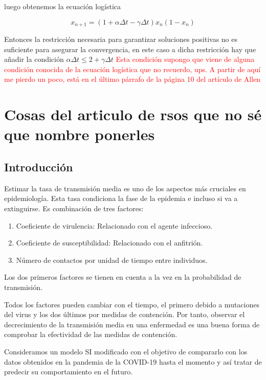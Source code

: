 luego obtenemos la ecuación logística

$$x_{n+1} = (1+\alpha \Delta t - \gamma \Delta t)x_n(1-x_n)$$

Entonces la restricción necesaria para garantizar soluciones positivas no es suficiente para asegurar la convergencia, en este caso a dicha restricción hay que añadir la condición $\alpha \Delta t \leq 2+\gamma \Delta t$ \textcolor{red}{Esta condición supongo que viene de alguna condición conocida de la ecuación logística que no recuerdo, ups. A partir de aquí me pierdo un poco, está en el último párrafo de la página 10 del artículo de Allen}


 







\section{Cosas del articulo de rsos que no sé que nombre ponerles}

\subsection{Introducción}

Estimar la tasa de transmisión media es uno de los aspectos más cruciales en epidemiología. Esta tasa condiciona la fase de la epidemia e incluso si va a extinguirse. Es combinación de tres factores:

\begin{enumerate}
\item Coeficiente de virulencia: Relacionado con el agente infeccioso.
\item Coeficiente de susceptibilidad: Relacionado con el anfitrión.
\item Número de contactos por unidad de tiempo entre individuos.
\end{enumerate}

Los dos primeros factores se tienen en cuenta a la vez en la probabilidad de transmisión.

Todos los factores pueden cambiar con el tiempo, el primero debido a mutaciones del virus y los dos últimos por medidas de contención. Por tanto, observar el decrecimiento de la transmisión media en una enfermedad es una buena forma de comprobar la efectividad de las medidas de contención.

Consideramos un modelo SI modificado con el objetivo de compararlo con los datos obtenidos en la pandemia de la COVID-19 hasta el momento y así tratar de predecir su comportamiento en el futuro.

